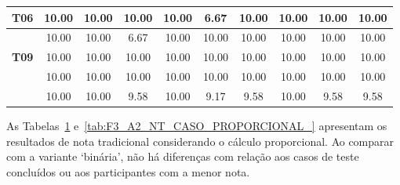 \begin{table}[htbp]
\begin{tabular}{c|ccccccccc|}
		\multicolumn{1}{|c|}{\textbf{T06}} & \multicolumn{1}{c|}{10.00} & \multicolumn{1}{c|}{10.00} & \multicolumn{1}{c|}{10.00} & \multicolumn{1}{c|}{10.00} & \multicolumn{1}{c|}{6.67} & \multicolumn{1}{c|}{10.00} & \multicolumn{1}{c|}{10.00} & \multicolumn{1}{c|}{10.00} & 10.00 \\ \hline
		\rowcolor[HTML]{F2F2F2} 
		\multicolumn{1}{|c|}{\cellcolor[HTML]{F2F2F2}\textbf{T08}} & \multicolumn{1}{c|}{\cellcolor[HTML]{F2F2F2}10.00} & \multicolumn{1}{c|}{\cellcolor[HTML]{F2F2F2}10.00} & \multicolumn{1}{c|}{\cellcolor[HTML]{F2F2F2}6.67} & \multicolumn{1}{c|}{\cellcolor[HTML]{F2F2F2}10.00} & \multicolumn{1}{c|}{\cellcolor[HTML]{F2F2F2}10.00} & \multicolumn{1}{c|}{\cellcolor[HTML]{F2F2F2}10.00} & \multicolumn{1}{c|}{\cellcolor[HTML]{F2F2F2}10.00} & \multicolumn{1}{c|}{\cellcolor[HTML]{F2F2F2}10.00} & 10.00 \\ \hline
		\multicolumn{1}{|c|}{\textbf{T09}} & \multicolumn{1}{c|}{10.00} & \multicolumn{1}{c|}{10.00} & \multicolumn{1}{c|}{10.00} & \multicolumn{1}{c|}{10.00} & \multicolumn{1}{c|}{10.00} & \multicolumn{1}{c|}{10.00} & \multicolumn{1}{c|}{10.00} & \multicolumn{1}{c|}{10.00} & 10.00 \\ \hline
		\rowcolor[HTML]{F2F2F2} 
		\multicolumn{1}{|c|}{\cellcolor[HTML]{F2F2F2}\textbf{T10}} & \multicolumn{1}{c|}{\cellcolor[HTML]{F2F2F2}10.00} & \multicolumn{1}{c|}{\cellcolor[HTML]{F2F2F2}10.00} & \multicolumn{1}{c|}{\cellcolor[HTML]{F2F2F2}10.00} & \multicolumn{1}{c|}{\cellcolor[HTML]{F2F2F2}10.00} & \multicolumn{1}{c|}{\cellcolor[HTML]{F2F2F2}10.00} & \multicolumn{1}{c|}{\cellcolor[HTML]{F2F2F2}10.00} & \multicolumn{1}{c|}{\cellcolor[HTML]{F2F2F2}10.00} & \multicolumn{1}{c|}{\cellcolor[HTML]{F2F2F2}10.00} & 10.00 \\ \hline
		\rowcolor[HTML]{D0CECE} 
		\multicolumn{1}{|c|}{\cellcolor[HTML]{D0CECE}\textbf{Média}} & \multicolumn{1}{c|}{\cellcolor[HTML]{D0CECE}10.00} & \multicolumn{1}{c|}{\cellcolor[HTML]{D0CECE}10.00} & \multicolumn{1}{c|}{\cellcolor[HTML]{D0CECE}9.58} & \multicolumn{1}{c|}{\cellcolor[HTML]{D0CECE}10.00} & \multicolumn{1}{c|}{\cellcolor[HTML]{D0CECE}9.17} & \multicolumn{1}{c|}{\cellcolor[HTML]{D0CECE}9.58} & \multicolumn{1}{c|}{\cellcolor[HTML]{D0CECE}10.00} & \multicolumn{1}{c|}{\cellcolor[HTML]{D0CECE}9.58} & 9.58 \\ \hline
	\end{tabular}
	\label{tab:F3_A2_NT_CASO_PROPORCIONAL}
\end{table}

As Tabelas~\ref{tab:F3_A2_NT_CASO_PROPORCIONAL} e~\ref{tab:F3_A2_NT_CASO_PROPORCIONAL_} apresentam os resultados de nota tradicional considerando o cálculo proporcional. Ao comparar com a variante `binária', não há diferenças com relação aos casos de teste concluídos ou aos participantes com a menor nota.

